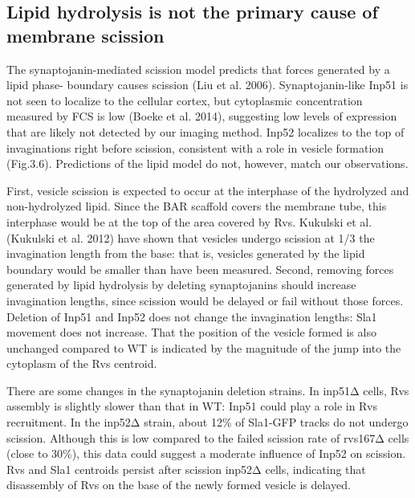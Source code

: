 {\subsection{Lipid hydrolysis is not the primary cause of membrane scission}
The synaptojanin-mediated scission model predicts that forces generated by a lipid phase- boundary causes scission (Liu et al. 2006). Synaptojanin-like Inp51 is not seen to localize to the cellular cortex, but cytoplasmic concentration measured by FCS is low (Boeke et al. 2014), suggesting low levels of expression that are likely not detected by our imaging method. Inp52 localizes to the top of invaginations right before scission, consistent with a role in vesicle formation (Fig.3.6). Predictions of the lipid model do not, however, match our observations. 

\vspace{5mm}

First, vesicle scission is expected to occur at the interphase of the hydrolyzed and non-hydrolyzed lipid. Since the BAR scaffold covers the membrane tube, this interphase would be at the top of the area covered by Rvs. Kukulski et al. (Kukulski et al. 2012) have shown that vesicles undergo scission at 1/3 the invagination length from the base: that is, vesicles generated by the lipid boundary would be smaller than have been measured. Second, removing forces generated by lipid hydrolysis by deleting synaptojanins should increase invagination lengths, since scission would be delayed or fail without those forces. Deletion of Inp51 and Inp52 does not change the invagination lengths: Sla1 movement does not increase. That the position of the vesicle formed is also unchanged compared to WT is indicated by the magnitude of the jump into the cytoplasm of the Rvs centroid. 

\vspace{5mm}

There are some changes in the synaptojanin deletion strains. In inp51Δ cells, Rvs assembly is slightly slower than that in WT: Inp51 could play a role in Rvs recruitment. In the inp52Δ strain, about 12\% of Sla1-GFP tracks do not undergo scission. Although this is low compared to the failed scission rate of rvs167Δ cells (close to 30\%), this data could suggest a moderate influence of Inp52 on scission. Rvs and Sla1 centroids persist after scission inp52Δ cells, indicating that disassembly of Rvs on the base of the newly formed vesicle is delayed.

\vspace{5mm}

}
